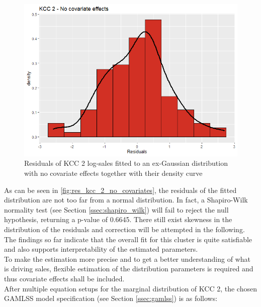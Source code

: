 \begin{figure}[H]
\centering
  \includegraphics[width=0.45\linewidth]{figures/res_kcc_2_no_covariates.png}
  \caption{Residuals of KCC 2 log-sales fitted to an ex-Gaussian distribution with no covariate effects together with their density curve}
  \label{fig:res_kcc_2_no_covariates}
\end{figure}

As can be seen in \autoref{fig:res_kcc_2_no_covariates}, the residuals of the fitted distribution are not too far from a normal distribution. 
In fact, a Shapiro-Wilk normality test (see Section \ref{ssec:shapiro_wilk}) will fail to reject the null hypothesis, returning a p-value of 0.6645.
There still exist skewness in the distribution of the residuals and correction will be attempted in the following. 
\\

The findings so far indicate that the overall fit for this cluster is quite satisfiable and also supports interpretability of the estimated parameters. \\
To make the estimation more precise and to get a better understanding of what is driving sales, flexible estimation of the distribution parameters is required and thus covariate effects shall be included. \\

After multiple equation setups for the marginal distribution of \ac{KCC} 2, the chosen \ac{GAMLSS} model specification (see Section \ref{ssec:gamlss}) is as follows:

